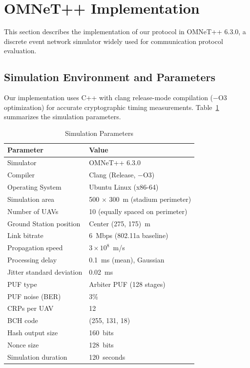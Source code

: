 \documentclass[11pt,a4paper]{article}
\begin{document}
\section{OMNeT++ Implementation}
\label{sec:implementation}

This section describes the implementation of our protocol in OMNeT++ 6.3.0, a discrete event network simulator widely used for communication protocol evaluation.

\subsection{Simulation Environment and Parameters}

Our implementation uses C++ with clang release-mode compilation ($-$O3 optimization) for accurate cryptographic timing measurements. Table~\ref{tab:sim_params} summarizes the simulation parameters.

\begin{table}[H]
\centering
\caption{Simulation Parameters}
\label{tab:sim_params}
\begin{tabular}{@{}ll@{}}
\toprule
\textbf{Parameter} & \textbf{Value} \\
\midrule
Simulator & OMNeT++ 6.3.0 \\
Compiler & Clang (Release, $-$O3) \\
Operating System & Ubuntu Linux (x86-64) \\
Simulation area & 500 $\times$ 300~m (stadium perimeter) \\
Number of UAVs & 10 (equally spaced on perimeter) \\
Ground Station position & Center (275, 175)~m \\
Link bitrate & 6~Mbps (802.11a baseline) \\
Propagation speed & $3 \times 10^8$~m/s \\
Processing delay & 0.1~ms (mean), Gaussian \\
Jitter standard deviation & 0.02~ms \\
PUF type & Arbiter PUF (128 stages) \\
PUF noise (BER) & 3\% \\
CRPs per UAV & 12 \\
BCH code & (255, 131, 18) \\
Hash output size & 160~bits \\
Nonce size & 128~bits \\
Simulation duration & 120~seconds \\
\bottomrule
\end{tabular}
\end{table}
\end{document}
